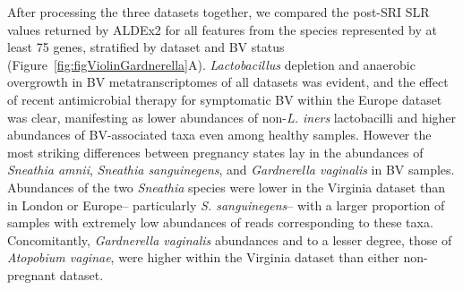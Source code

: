\documentclass[sn-mathphys,Numbered]{sn-jnl}%
\begin{document}
After processing the three datasets together, we compared the post-SRI SLR values returned by ALDEx2 for all features from the species represented by at least 75 genes, stratified by dataset and BV status (Figure~\ref{fig:figViolinGardnerella}A). \textit{Lactobacillus} depletion and anaerobic overgrowth in BV metatranscriptomes of all datasets was evident, and the effect of recent antimicrobial therapy for symptomatic BV within the Europe dataset was clear, manifesting as lower abundances of non-\textit{L. iners} lactobacilli and higher abundances of BV-associated taxa even among healthy samples. However the most striking differences between pregnancy states lay in the abundances of \textit{Sneathia amnii}, \textit{Sneathia sanguinegens}, and \textit{Gardnerella vaginalis} in BV samples. Abundances of the two \textit{Sneathia} species were lower in the Virginia dataset than in London or Europe-- particularly \textit{S. sanguinegens}-- with a larger proportion of samples with extremely low abundances of reads corresponding to these taxa. Concomitantly, \textit{Gardnerella vaginalis} abundances and to a lesser degree, those of \textit{Atopobium vaginae}, were higher within the Virginia dataset than either non-pregnant dataset.
\end{document}
